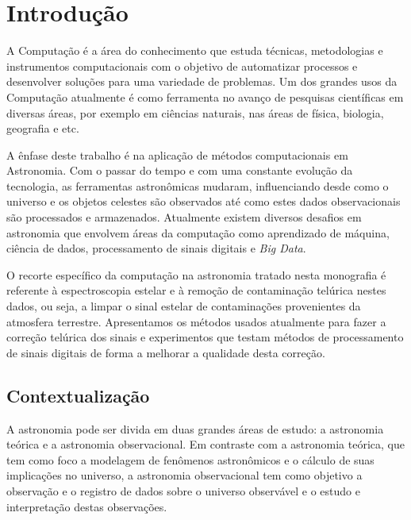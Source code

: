 \chapter{Introdução}
\label{cap:introducao}

A Computação é a área do conhecimento que estuda técnicas, metodologias e instrumentos computacionais com o objetivo de automatizar processos e desenvolver soluções para uma variedade de problemas. Um dos grandes usos da Computação atualmente é como ferramenta no avanço de pesquisas científicas em diversas áreas, por exemplo em ciências naturais, nas áreas de física, biologia, geografia e etc.

A ênfase deste trabalho é na aplicação de métodos computacionais em Astronomia. Com o passar do tempo e com uma constante evolução da tecnologia, as ferramentas astronômicas mudaram, influenciando desde como o universo e os objetos celestes são observados até como estes dados observacionais são processados e armazenados. Atualmente existem diversos desafios em astronomia que envolvem áreas da computação como aprendizado de máquina, ciência de dados, processamento de sinais digitais e \textit{Big Data}. 

O recorte específico da computação na astronomia tratado nesta monografia é referente à espectroscopia estelar e à remoção de contaminação telúrica nestes dados, ou seja, a limpar o sinal estelar de contaminações provenientes da atmosfera terrestre. Apresentamos os métodos usados atualmente para fazer a correção telúrica dos sinais e experimentos que testam métodos de processamento de sinais digitais de forma a melhorar a qualidade desta correção.

\section{Contextualização}

A astronomia pode ser divida em duas grandes áreas de estudo: a astronomia teórica e a astronomia observacional. Em contraste com a astronomia teórica, que tem como foco a modelagem de fenômenos astronômicos e o cálculo de suas implicações no universo, a astronomia observacional tem como objetivo a observação e o registro de dados sobre o universo observável e o estudo e interpretação destas observações.  

